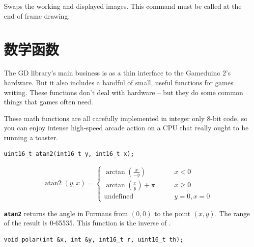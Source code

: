 \documentclass[10pt]{book}
\newcommand{\mach}[1]{\texttt{\textbf{#1}}}
\begin{document}
\begin{CJK}{UTF8}{gkai}
Swaps the working and displayed images.
This command must be called at the end of frame drawing.

\chapter{数学函数}

The GD library's main business is as a thin
interface to the Gameduino 2's hardware.
But it also includes a handful of small, useful functions for games writing.
These functions don't deal with hardware -- but they do some common
things that games often need.

These math functions are all carefully implemented in integer only 
8-bit code, so you can enjoy intense high-speed arcade action on a CPU that really
ought to be running a toaster.


\begin{framed}
\begin{verbatim}
uint16_t atan2(int16_t y, int16_t x);
\end{verbatim}
\end{framed}

\[
\operatorname{atan2}(y, x) = \begin{cases}
\arctan\left(\frac x {-y} \right) & \qquad x < 0 \\
\arctan\left(\frac x y \right) + \pi& \qquad x \ge 0 \\
\text{undefined} & \qquad y = 0, x = 0
\end{cases}
\]

\mach{atan2} returns the angle in Furmans from $(0,0)$ to the point $(x, y)$.
The range of the result is 0-65535.
This function is the inverse of .
\newpage


\begin{framed}
\begin{verbatim}
void polar(int &x, int &y, int16_t r, uint16_t th);
\end{verbatim}
\end{framed}

\begin{center}
\end{center}


\end{CJK}
\end{document}
